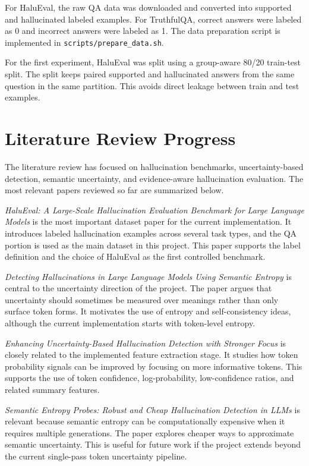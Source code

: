 \documentclass[11pt]{article}
\begin{document}
For HaluEval, the raw QA data was downloaded and converted into supported and hallucinated labeled examples. For TruthfulQA, correct answers were labeled as 0 and incorrect answers were labeled as 1. The data preparation script is implemented in \texttt{scripts/prepare\_data.sh}.

For the first experiment, HaluEval was split using a group-aware 80/20 train-test split. The split keeps paired supported and hallucinated answers from the same question in the same partition. This avoids direct leakage between train and test examples.

\section{Literature Review Progress}

The literature review has focused on hallucination benchmarks, uncertainty-based detection, semantic uncertainty, and evidence-aware hallucination evaluation. The most relevant papers reviewed so far are summarized below.

\textit{HaluEval: A Large-Scale Hallucination Evaluation Benchmark for Large Language Models} is the most important dataset paper for the current implementation. It introduces labeled hallucination examples across several task types, and the QA portion is used as the main dataset in this project. This paper supports the label definition and the choice of HaluEval as the first controlled benchmark.

\textit{Detecting Hallucinations in Large Language Models Using Semantic Entropy} is central to the uncertainty direction of the project. The paper argues that uncertainty should sometimes be measured over meanings rather than only surface token forms. It motivates the use of entropy and self-consistency ideas, although the current implementation starts with token-level entropy.

\textit{Enhancing Uncertainty-Based Hallucination Detection with Stronger Focus} is closely related to the implemented feature extraction stage. It studies how token probability signals can be improved by focusing on more informative tokens. This supports the use of token confidence, log-probability, low-confidence ratios, and related summary features.

\textit{Semantic Entropy Probes: Robust and Cheap Hallucination Detection in LLMs} is relevant because semantic entropy can be computationally expensive when it requires multiple generations. The paper explores cheaper ways to approximate semantic uncertainty. This is useful for future work if the project extends beyond the current single-pass token uncertainty pipeline.
\end{document}
